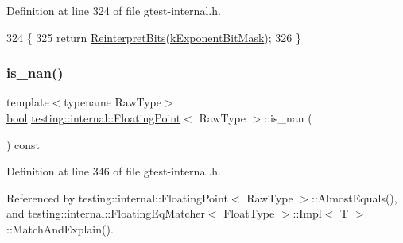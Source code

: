 Definition at line 324 of file gtest-\/internal.\+h.


\begin{DoxyCode}
324                             \{
325     \textcolor{keywordflow}{return} \hyperlink{classtesting_1_1internal_1_1FloatingPoint_ac551f793522e54fbd8a25acb79eac5b1}{ReinterpretBits}(\hyperlink{classtesting_1_1internal_1_1FloatingPoint_a66065dfc4d5f41100f686159637af23b}{kExponentBitMask});
326   \}
\end{DoxyCode}
\mbox{\label{classtesting_1_1internal_1_1FloatingPoint_a1fc654fd206efa98e480aa1e034f30d5}} 
\subsubsection{\texorpdfstring{is\+\_\+nan()}{is\_nan()}}
{\footnotesize\ttfamily template$<$typename Raw\+Type$>$ \\
\hyperlink{classbool}{bool} \hyperlink{classtesting_1_1internal_1_1FloatingPoint}{testing\+::internal\+::\+Floating\+Point}$<$ Raw\+Type $>$\+::is\+\_\+nan (\begin{DoxyParamCaption}{ }\end{DoxyParamCaption}) const\hspace{0.3cm}{\ttfamily [inline]}}



Definition at line 346 of file gtest-\/internal.\+h.



Referenced by testing\+::internal\+::\+Floating\+Point$<$ Raw\+Type $>$\+::\+Almost\+Equals(), and testing\+::internal\+::\+Floating\+Eq\+Matcher$<$ Float\+Type $>$\+::\+Impl$<$ T $>$\+::\+Match\+And\+Explain().


